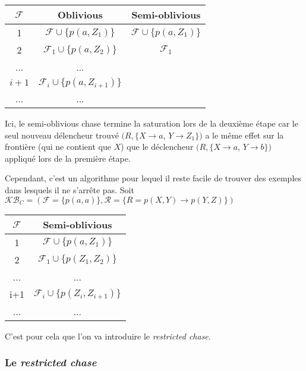 \begin{center}
\begin{tabular}{|c|c|c|}
    \hline
    $\mathcal{F}$ & Oblivious & Semi-oblivious \\ 
    \hline
    1 &$\mathcal{F} \cup \{p(a, Z_1)\}$ & $\mathcal{F} \cup \{p(a, Z_1)\} $\\ 
    \hline
    2 &$\mathcal{F}_1 \cup \{p(a, Z_2)\}$ &$\mathcal{F}_1$\\
    \hline
    ... & ... & \\
    \hline
    $i+1$ & $\mathcal{F}_i \cup \{p(a, Z_{i+1})\} $& \\
     \hline
     ... & ... & \\
     \hline
\end{tabular}
\end{center}

Ici, le semi-oblivious chase termine la saturation lors de la deuxième étape car le seul nouveau délencheur trouvé $(R,\{X \rightarrow a$, $Y \rightarrow Z_1\})$ a le même effet sur la frontière (qui ne contient que $X$) que le déclencheur $(R,\{X \rightarrow a$, $Y \rightarrow b\})$ appliqué lors de la première étape.  

\par Cependant, c'est un algorithme pour lequel il reste facile de trouver des exemples dans lesquels il ne s'arrête pas.
Soit $\mathcal{KB}_C = (\mathcal{F} = \{p(a,a)\}, \mathcal{R} = \{R = p(X,Y) \rightarrow p(Y,Z) \})$

\begin{center}
\begin{tabular}{|c|c|}
    \hline
    $\mathcal{F}$ & Semi-oblivious \\ 
    \hline
    1  & $\mathcal{F} \cup \{p(a, Z_1)\} $ \\ 
    \hline
    2  &$\mathcal{F}_1 \cup \{p(Z_1, Z_2)\}$  \\
    \hline
    ...  & ...  \\
    \hline
    i+1 & $\mathcal{F}_i \cup \{p(Z_{i}, Z_{i+1})\} $   \\
     \hline
     ...  & ...  \\
     \hline
\end{tabular}
\end{center}
C'est pour cela que l'on va introduire le \textit{restricted chase}.

\subsubsection{Le \textit{restricted chase}}\label{sec:restricted_chase}


